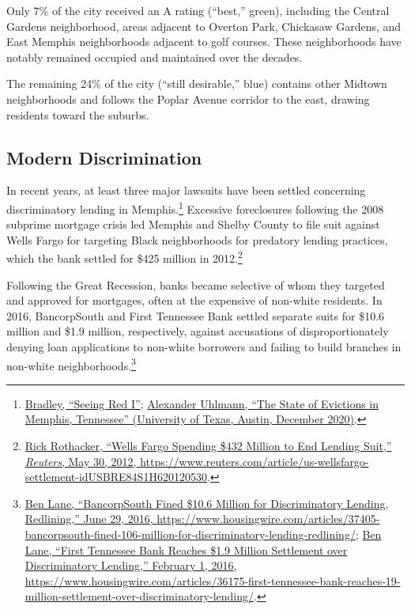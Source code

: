 \documentclass[
  openany]{book}
\begin{document}
Only 7\% of the city received an A rating (``best,'' green), including the Central Gardens neighborhood, areas adjacent to Overton Park, Chickasaw Gardens, and East Memphis neighborhoods adjacent to golf courses. These neighborhoods have notably remained occupied and maintained over the decades.

The remaining 24\% of the city (``still desirable,'' blue) contains other Midtown neighborhoods and follows the Poplar Avenue corridor to the east, drawing residents toward the suburbs.

\hypertarget{modern-discrimination}{%
\subsection{Modern Discrimination}\label{modern-discrimination}}

In recent years, at least three major lawsuits have been settled concerning discriminatory lending in Memphis.\footnote{\protect\hyperlink{ref-bradley2019}{Bradley, {``Seeing Red I''}}; \protect\hyperlink{ref-uhlmann2020}{Alexander Uhlmann, {``The State of Evictions in Memphis, Tennessee''} (University of Texas, Austin, December 2020)}.} Excessive foreclosures following the 2008 subprime mortgage crisis led Memphis and Shelby County to file suit against Wells Fargo for targeting Black neighborhoods for predatory lending practices, which the bank settled for \$425 million in 2012.\footnote{\protect\hyperlink{ref-rothacker2012}{Rick Rothacker, {``Wells Fargo Spending {\$}432 Million to End Lending Suit,''} \emph{Reuters}, May 30, 2012, \url{https://www.reuters.com/article/us-wellsfargo-settlement-idUSBRE84S1H620120530}}.}

Following the Great Recession, banks became selective of whom they targeted and approved for mortgages, often at the expensive of non-white residents. In 2016, BancorpSouth and First Tennessee Bank settled separate suits for \$10.6 million and \$1.9 million, respectively, against accusations of disproportionately denying loan applications to non-white borrowers and failing to build branches in non-white neighborhoods.\footnote{\protect\hyperlink{ref-lane2016a}{Ben Lane, {``BancorpSouth Fined {\$}10.6 Million for Discriminatory Lending, Redlining,''} June 29, 2016, \url{https://www.housingwire.com/articles/37405-bancorpsouth-fined-106-million-for-discriminatory-lending-redlining/}}; \protect\hyperlink{ref-lane2016}{Ben Lane, {``First Tennessee Bank Reaches {\$}1.9 Million Settlement over Discriminatory Lending,''} February 1, 2016, \url{https://www.housingwire.com/articles/36175-first-tennessee-bank-reaches-19-million-settlement-over-discriminatory-lending/}}.}
\end{document}
